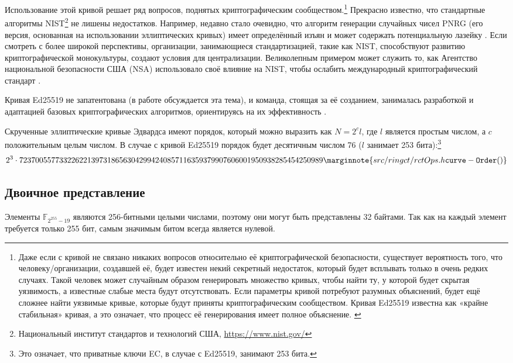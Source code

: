 Использование этой кривой решает ряд вопросов, поднятых криптографическим сообщес\-твом.\footnote{Даже если с кривой не связано никаких вопросов относительно её криптографической безопасности, существует вероятность того, что человеку/организации, создавшей её, будет известен некий секретный недостаток, который будет всплывать только в очень редких случаях. Такой человек может случайным образом генерировать множество кривых, чтобы найти ту, у которой будет скрытая уязвимость, а известные слабые места будут отсутствовать. Если параметры кривой потребуют разумных объяснений, будет ещё сложнее найти уязвимые кривые, которые будут приняты криптографическим сообществом. Кривая Ed25519 известна как «крайне стабильная» кривая, а это означает, что процесс её генерирования имеет полное объяснение. \cite{elliptic-curve-rigidity}} Прекрасно известно, что стандартные алгоритмы NIST\footnote{\label{NIST_note}Национальный институт стандартов и технологий США, \url{https://www.nist.gov/}} 
не лишены недостатков. Например, недавно стало очевидно, что алгоритм генерации случайных чисел PNRG (его версия, основанная на использовании эллиптических кривых) имеет определённый изъян и может содержать потенциальную лазейку \cite{hales2014nsa}. Если смотреть с более широкой перспективы, организации, занимающиеся стандартизацией, такие как NIST, способствуют развитию крип\-тографической монокультуры, создают условия для централизации. Великолепным примером может служить то, как Агентство национальной безопасности США (NSA) использовало своё влияние на NIST, чтобы ослабить международный криптографический стандарт \cite{NSA-NIST}.

Кривая Ed25519 не запатентована (в работе \cite{ECC-patents} обсуждается эта тема), и команда, стоящая за её созданием, занималась разработкой и адаптацией базовых криптографических алгоритмов, ориентируясь на их эффективность \cite{Bernstein2007}.

Скрученные эллиптические кривые Эдвардса имеют порядок, который можно выразить как \(N=2^c l\), где \(l\) является простым числом, а \(c\) положительным целым числом. В случае с кривой Ed25519 порядок будет десятичным числом 76 ($l$ занимает 253 бита):\footnote{Это означает, что приватные ключи EC, в случае с Ed25519, занимают 253 бита.}\vspace{.175cm}
\[2^3 \cdot 7237005577332262213973186563042994240857116359379907606001950938285454250989\marginnote{src/ringct/ rctOps.h {\tt curve- Order()}}\]


\subsection{Двоичное представление}
\label{binary_note}
Элементы \(\mathbb{F}_{2^{255} - 19} \) являются 256-битными целыми числами, поэтому они могут быть представ\-лены 32 байтами. Так как на каждый элемент требуется только 255 бит, самым значимым битом всегда является нулевой.


